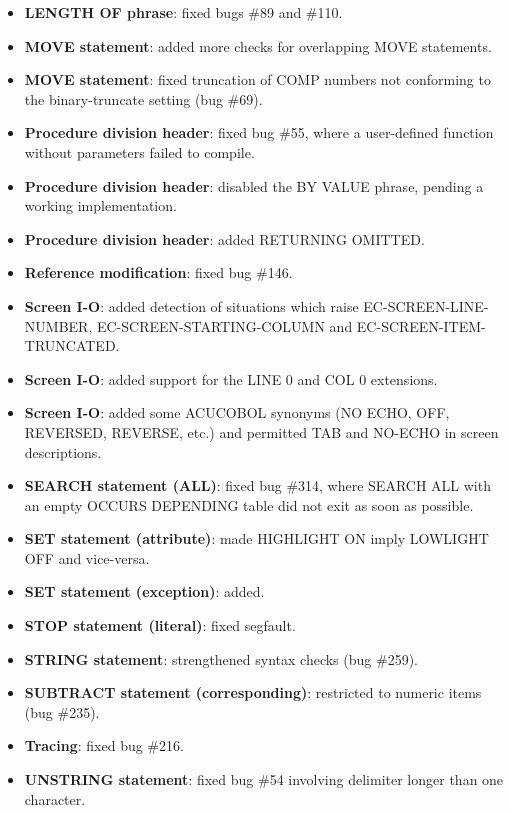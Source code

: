 \begin{itemize}
\item \textbf{LENGTH OF phrase}: fixed bugs \#89 and \#110.
\item \textbf{MOVE statement}: added more checks for overlapping MOVE statements.
\item \textbf{MOVE statement}: fixed truncation of COMP numbers not conforming to the binary-truncate setting (bug \#69).
\item \textbf{Procedure division header}: fixed bug \#55, where a user-defined function without parameters failed to compile.
\item \textbf{Procedure division header}: disabled the BY VALUE phrase, pending a working implementation.
\item \textbf{Procedure division header}: added RETURNING OMITTED.
\item \textbf{Reference modification}: fixed bug \#146.
\item \textbf{Screen I-O}: added detection of situations which raise EC-SCREEN-LINE-NUMBER, EC-SCREEN-STARTING-COLUMN and EC-SCREEN-ITEM-TRUNCATED.
\item \textbf{Screen I-O}: added support for the LINE 0 and COL 0 extensions.
\item \textbf{Screen I-O}: added some ACUCOBOL synonyms (NO ECHO, OFF, REVERSED, REVERSE, etc.) and permitted TAB and NO-ECHO in screen descriptions.
\item \textbf{SEARCH statement (ALL)}: fixed bug \#314, where SEARCH ALL with an empty OCCURS DEPENDING table did not exit as soon as possible.
\item \textbf{SET statement (attribute)}: made HIGHLIGHT ON imply LOWLIGHT OFF and vice-versa.
\item \textbf{SET statement (exception)}: added.
\item \textbf{STOP statement (literal)}: fixed segfault.
\item \textbf{STRING statement}: strengthened syntax checks (bug \#259).
\item \textbf{SUBTRACT statement (corresponding)}: restricted to numeric items (bug \#235).
\item \textbf{Tracing}: fixed bug \#216.
\item \textbf{UNSTRING statement}: fixed bug \#54 involving delimiter longer than one character.
\end{itemize}

